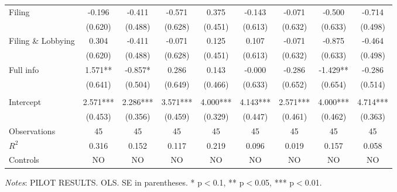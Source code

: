 \documentclass[11pt]{article}
\begin{document}
\begin{landscape}
\begin{table}[!htbp]
\begin{threeparttable}
\begin{tabular}{l|cccccccc}
Filing & -0.196 & -0.411 & -0.571 & 0.375 & -0.143 & -0.071 & -0.500 & -0.714 \\
 & (0.620) & (0.488) & (0.628) & (0.451) & (0.613) & (0.632) & (0.633) & (0.498) \\
Filing \& Lobbying & 0.304 & -0.411 & -0.071 & 0.125 & 0.107 & -0.071 & -0.875 & -0.464 \\
 & (0.620) & (0.488) & (0.628) & (0.451) & (0.613) & (0.632) & (0.633) & (0.498) \\
Full info & 1.571** & -0.857* & 0.286 & 0.143 & -0.000 & -0.286 & -1.429** & -0.286 \\
 & (0.641) & (0.504) & (0.649) & (0.466) & (0.633) & (0.652) & (0.654) & (0.514) \\
\\[0.5em]
Intercept & 2.571*** & 2.286*** & 3.571*** & 4.000*** & 4.143*** & 2.571*** & 4.000*** & 4.714*** \\
 & (0.453) & (0.356) & (0.459) & (0.329) & (0.447) & (0.461) & (0.462) & (0.363) \\
\midrule
Observations & 45 & 45 & 45 & 45 & 45 & 45 & 45 & 45 \\
$R^2$ & 0.316 & 0.152 & 0.117 & 0.219 & 0.096 & 0.019 & 0.157 & 0.058 \\
Controls & NO & NO & NO & NO & NO & NO & NO & NO \\
\bottomrule
\end{tabular}
\begin{tablenotes}[flushleft]
\footnotesize
\item \textit{Notes}: PILOT RESULTS. OLS. SE in parentheses. * p$<$0.1, ** p$<$0.05, *** p$<$0.01.
\end{tablenotes}
\end{threeparttable}
\end{table}
\end{landscape}
\FloatBarrier
\end{document}
